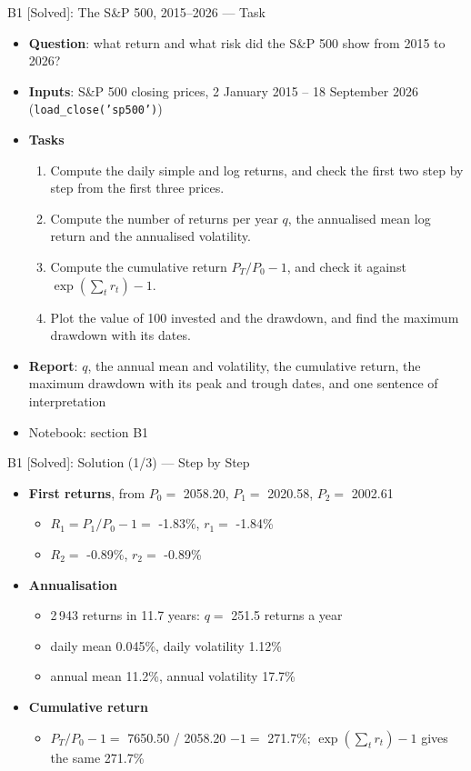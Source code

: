 \begin{frame}{B1 [Solved]: The S\&P 500, 2015--2026 --- Task}
\itemsize{\footnotesize}
\begin{itemize}
\item \textbf{Question}: what return and what risk did the S\&P 500 show from 2015 to 2026?
\item \textbf{Inputs}: S\&P 500 closing prices, 2 January 2015 -- 18 September 2026 (\texttt{load\_close('sp500')})
\item \textbf{Tasks}
\begin{enumerate}
    \item Compute the daily simple and log returns, and check the first two step by step from the first three prices.
    \item Compute the number of returns per year $q$, the annualised mean log return and the annualised volatility.
    \item Compute the cumulative return $P_T/P_0 - 1$, and check it against $\exp(\sum_t r_t) - 1$.
    \item Plot the value of 100 invested and the drawdown, and find the maximum drawdown with its dates.
\end{enumerate}
\item \textbf{Report}: $q$, the annual mean and volatility, the cumulative return, the maximum drawdown with its peak and trough dates, and one sentence of interpretation
\item Notebook: section B1
\end{itemize}
\end{frame}

\begin{frame}{B1 [Solved]: Solution (1/3) --- Step by Step}
\itemsize{\small}
\begin{itemize}
    \item \textbf{First returns}, from $P_0 = $ 2058.20, $P_1 = $ 2020.58, $P_2 = $ 2002.61
    \begin{itemize}
        \item $R_1 = P_1/P_0 - 1 = $ -1.83\%, $r_1 = $ -1.84\%
        \item $R_2 = $ -0.89\%, $r_2 = $ -0.89\%
    \end{itemize}
    \item \textbf{Annualisation}
    \begin{itemize}
        \item 2\,943 returns in 11.7 years: $q = $ 251.5 returns a year
        \item daily mean 0.045\%, daily volatility 1.12\%
        \item annual mean 11.2\%, annual volatility 17.7\%
    \end{itemize}
    \item \textbf{Cumulative return}
    \begin{itemize}
        \item $P_T/P_0 - 1 = $ 7650.50 / 2058.20 $- 1 = $ 271.7\%; $\exp(\sum_t r_t) - 1$ gives the same 271.7\%
    \end{itemize}
\end{itemize}
\end{frame}

